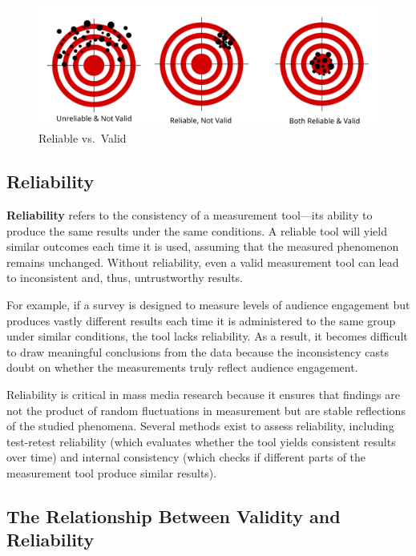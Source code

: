 \documentclass[
]{book}
\begin{document}
\begin{figure}
\centering
\includegraphics[width=1\linewidth,height=\textheight,keepaspectratio]{images/rel-val.png}
\caption{Reliable vs.~Valid}
\end{figure}

\subsection*{Reliability}\label{reliability}

\textbf{Reliability} refers to the consistency of a measurement tool---its ability to produce the same results under the same conditions. A reliable tool will yield similar outcomes each time it is used, assuming that the measured phenomenon remains unchanged. Without reliability, even a valid measurement tool can lead to inconsistent and, thus, untrustworthy results.

For example, if a survey is designed to measure levels of audience engagement but produces vastly different results each time it is administered to the same group under similar conditions, the tool lacks reliability. As a result, it becomes difficult to draw meaningful conclusions from the data because the inconsistency casts doubt on whether the measurements truly reflect audience engagement.

Reliability is critical in mass media research because it ensures that findings are not the product of random fluctuations in measurement but are stable reflections of the studied phenomena. Several methods exist to assess reliability, including test-retest reliability (which evaluates whether the tool yields consistent results over time) and internal consistency (which checks if different parts of the measurement tool produce similar results).

\subsection*{The Relationship Between Validity and Reliability}\label{the-relationship-between-validity-and-reliability}
\end{document}
